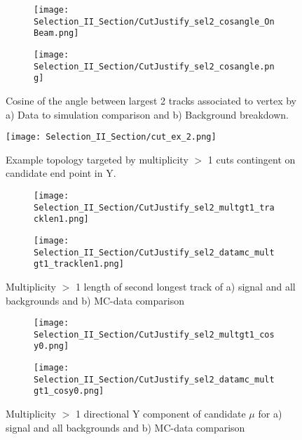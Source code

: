 \begin{figure}[H]
\centering
  \begin{subfigure}[t]{0.4\textwidth}
    \centering
\texttt{[image: Selection\_II\_Section/CutJustify\_sel2\_cosangle\_OnBeam.png]}
  \caption{ }
  \end{subfigure} 
  \hspace{20mm}
  \begin{subfigure}[t]{0.4\textwidth}
    \centering
\texttt{[image: Selection\_II\_Section/CutJustify\_sel2\_cosangle.png]}
  \caption{ }
  \end{subfigure} 
\caption{Cosine of the angle between largest 2 tracks associated to vertex by a) Data to simulation comparison and b) Background breakdown. }
\label{fig:cutjust_sel2_cosangle}
\end{figure}


\begin{figure}[H]
  \centering
  \texttt{[image: Selection\_II\_Section/cut\_ex\_2.png]}
  \caption{ Example topology targeted by multiplicity $>$ 1 cuts contingent on candidate end point in Y. }
\label{fig:cut_ex_2}
\end{figure}


\begin{figure}[H]
\centering
 \begin{subfigure}[t]{0.4\textwidth}
    \centering
\texttt{[image: Selection\_II\_Section/CutJustify\_sel2\_multgt1\_tracklen1.png]}
 \caption{ }
  \end{subfigure} 
  \hspace{20mm}
  \begin{subfigure}[t]{0.4\textwidth}
    \centering
\texttt{[image: Selection\_II\_Section/CutJustify\_sel2\_datamc\_multgt1\_tracklen1.png]}
 \caption{ }
  \end{subfigure} 
\caption{Multiplicity $>$ 1 length of second longest track of a) signal and all backgrounds and b) MC-data comparison }
\label{fig:cutjust_sel2_multgt1_tracklen1}
\end{figure}

\begin{figure}[H]
\centering
  \begin{subfigure}[t]{0.4\textwidth}
    \centering
\texttt{[image: Selection\_II\_Section/CutJustify\_sel2\_multgt1\_cosy0.png]}
 \caption{ }
  \end{subfigure} 
  \hspace{20mm}
  \begin{subfigure}[t]{0.4\textwidth}
    \centering
\texttt{[image: Selection\_II\_Section/CutJustify\_sel2\_datamc\_multgt1\_cosy0.png]}
 \caption{ }
  \end{subfigure} 
\caption{Multiplicity $>$ 1 directional Y component of candidate $\mu$ for a) signal and all backgrounds and b) MC-data comparison }
\label{fig:cutjust_sel2_multgt1_dcosy}
\end{figure}

